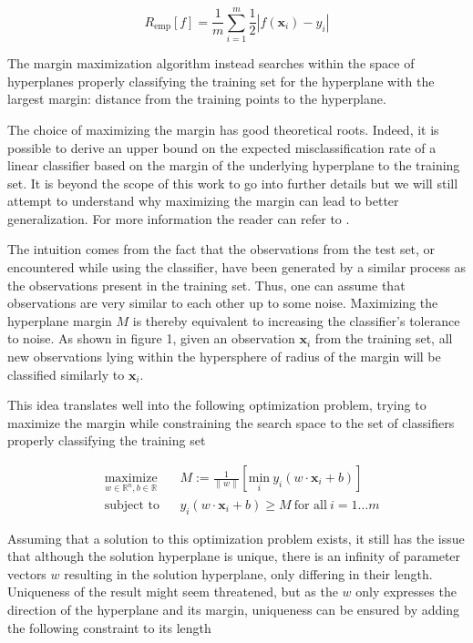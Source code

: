 \begin{equation}
  R_{\text{emp}}[f] = \frac{1}{m}\sum^m_{i=1}\frac{1}{2}|f(\mathbf{x}_i) - y_i|
\end{equation}

The margin maximization algorithm instead searches within the space of hyperplanes properly classifying the training set for the hyperplane with the largest margin: distance from the training points to the hyperplane.

The choice of maximizing the margin has good theoretical roots. Indeed, it is possible to derive an upper bound on the expected misclassification rate of a linear classifier based on the margin of the underlying hyperplane to the training set. It is beyond the scope of this work to go into further details but we will still attempt to understand why maximizing the margin can lead to better generalization. For more information the reader can refer to \cite{Vapnik:1995:NSL:211359}.

The intuition comes from the fact that the observations from the test set, or encountered while using the classifier, have been generated by a similar process as the observations present in the training set. Thus, one can assume that observations are very similar to each other up to some noise. Maximizing the hyperplane margin $M$ is thereby equivalent to increasing the classifier's tolerance to noise. As shown in figure 1, given an observation $\mathbf{x}_i$ from the training set, all new observations lying within the hypersphere of radius of the margin will be classified similarly to $\mathbf{x}_i$.

This idea translates well into the following optimization problem, trying to maximize the margin while constraining the search space to the set of classifiers properly classifying the training set

\begin{equation}
  \begin{aligned}
    &\underset{w \in \mathbb{R}^n, b \in \mathbb{R}} {\text{maximize}}
    & & M := \frac{1}{\|w\|} \left[\underset{i} {\text{min}}\ 
    y_i(w \cdot \mathbf{x}_i + b)\right]\\
    &\text{subject to}
    & &y_i(w \cdot \mathbf{x}_i + b) \ge M\ \text{for all}\ i = 1 \dotsc m
  \end{aligned}
\end{equation}

Assuming that a solution to this optimization problem exists, it still has the issue that although the solution hyperplane is unique, there is an infinity of parameter vectors $w$ resulting in the solution hyperplane, only differing in their length. Uniqueness of the result might seem threatened, but as the $w$ only expresses the direction of the hyperplane and its margin, uniqueness can be ensured by adding the following constraint to its length

